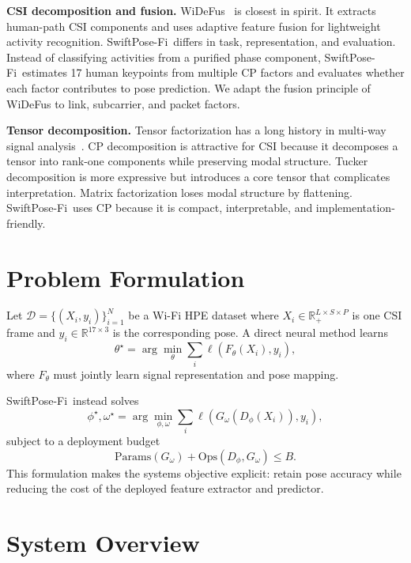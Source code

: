 \documentclass[10pt,conference]{IEEEtran}
\newcommand{\method}{SwiftPose-Fi}
\begin{document}
\textbf{CSI decomposition and fusion.}
WiDeFus~\cite{widefus2026} is closest in spirit. It extracts human-path CSI components and uses adaptive feature fusion for lightweight activity recognition. \method\ differs in task, representation, and evaluation. Instead of classifying activities from a purified phase component, \method\ estimates 17 human keypoints from multiple CP factors and evaluates whether each factor contributes to pose prediction. We adapt the fusion principle of WiDeFus to link, subcarrier, and packet factors.

\textbf{Tensor decomposition.}
Tensor factorization has a long history in multi-way signal analysis~\cite{kolda2009}. CP decomposition is attractive for CSI because it decomposes a tensor into rank-one components while preserving modal structure. Tucker decomposition is more expressive but introduces a core tensor that complicates interpretation. Matrix factorization loses modal structure by flattening. \method\ uses CP because it is compact, interpretable, and implementation-friendly.

\section{Problem Formulation}

Let $\mathcal{D}=\{(X_i,y_i)\}_{i=1}^{N}$ be a Wi-Fi HPE dataset where $X_i\in\mathbb{R}_{+}^{L\times S\times P}$ is one CSI frame and $y_i\in\mathbb{R}^{17\times3}$ is the corresponding pose. A direct neural method learns
\begin{equation}
\theta^\star=\arg\min_\theta \sum_i \ell(F_\theta(X_i),y_i),
\end{equation}
where $F_\theta$ must jointly learn signal representation and pose mapping.

\method\ instead solves
\begin{equation}
\phi^\star,\omega^\star=
\arg\min_{\phi,\omega}\sum_i
\ell(G_\omega(D_\phi(X_i)),y_i),
\end{equation}
subject to a deployment budget
\begin{equation}
\mathrm{Params}(G_\omega)+\mathrm{Ops}(D_\phi,G_\omega)\leq B.
\end{equation}
This formulation makes the systems objective explicit: retain pose accuracy while reducing the cost of the deployed feature extractor and predictor.

\section{System Overview}
\end{document}
